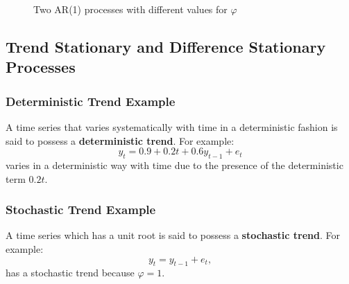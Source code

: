 \documentclass[11pt]{article}
\begin{document}
\begin{figure}[h]
    \centering
    \qquad
    \caption{Two AR(1) processes with different values for $\varphi$}%
    \label{fig:asymptotic stationarity}%
\end{figure}

\subsection{Trend Stationary and Difference Stationary Processes}

\subsubsection{Deterministic Trend Example}

A time series that varies systematically with time in a deterministic fashion is said to possess a \textbf{deterministic trend}. For example:
\[y_t = 0.9 + 0.2t + 0.6y_{t-1} + e_t\]
varies in a deterministic way with time due to the presence of the deterministic term $0.2t$.

\subsubsection{Stochastic Trend Example}

A time series which has a unit root is said to possess a \textbf{stochastic trend}. For example:
\[y_t = y_{t-1} + e_t,\]
has a stochastic trend because $\varphi = 1$.
\end{document}
